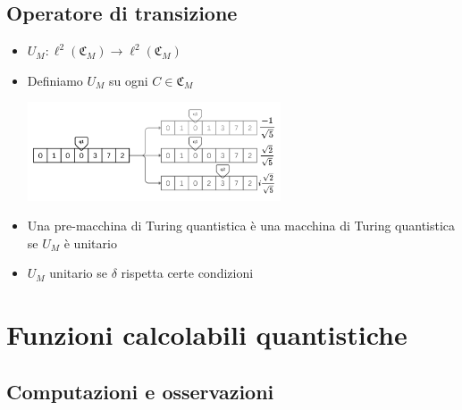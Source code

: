 \documentclass{beamer}
\newcommand{\conf}{\mathfrak{C}_{M}}
\newcommand{\hil}{\ell^{2}}
\begin{document}
\subsection{Operatore di transizione}

\begin{frame}{\subsecname}{}
	\begin{itemize}
		\item<+-> \( U_{M} : \hil \left ( \conf \right ) \rightarrow \hil \left ( \conf \right ) \)
		\item<+-> Definiamo \( U_{M} \) su ogni \( C \in \conf \) \par
		\centering\includegraphics[width=7.5cm]{transition2.png}
		\item<+-> Una pre-macchina di Turing quantistica è una \alert{macchina di Turing quantistica} se \( U_{M} \) è unitario
		\item<+-> \( U_{M} \) unitario se \(\delta\) rispetta certe condizioni
	\end{itemize}
\end{frame}

\section{Funzioni calcolabili quantistiche}

\subsection{Computazioni e osservazioni}
\end{document}
